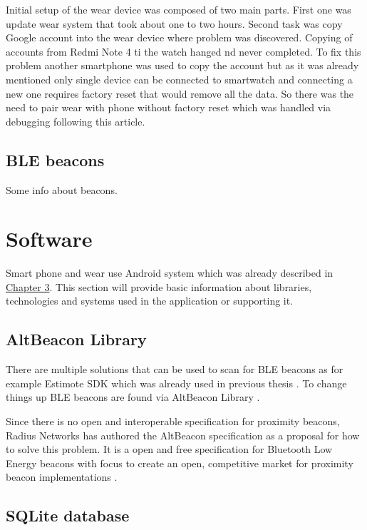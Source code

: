 Initial setup of the wear device was composed of two main parts. First one was update wear system that took about one to two hours. Second task was copy Google account into the wear device where problem was discovered. Copying of accounts from Redmi Note 4 ti the watch hanged nd never completed. To fix this problem another smartphone was used to copy the account but as it was already mentioned only single device can be connected to smartwatch and connecting a new one requires factory reset that would remove all the data. So there was the need to pair wear with phone without factory reset which was handled via debugging following this \cite{HtPAWW} article.

\subsection{BLE beacons}\label{subsec:BLEBeacons}
Some info about beacons.

\section{Software}\label{sec:Software}
Smart phone and wear use Android system which was already described in \hyperref[sec:Android]{Chapter 3}. This section will provide basic information about libraries, technologies and systems used in the application or supporting it.

\subsection{AltBeacon Library}\label{subsec:AltBeaconLibrary}
There are multiple solutions that can be used to scan for BLE beacons as for example Estimote SDK \cite{ESDKfA} which was already used in previous thesis \cite{PMRIL}. To change things up BLE beacons are found via AltBeacon Library \cite{ABL}.

Since there is no open and interoperable specification for proximity beacons, Radius Networks has authored the AltBeacon specification as a proposal for how to solve this problem. It is a open and free specification for Bluetooth Low Energy beacons with focus to create an open, competitive market for proximity beacon implementations \cite{AltB}.



\subsection{SQLite database}
\label{subsec:SQLiteDatabase}

